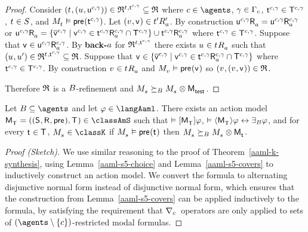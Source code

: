 \begin{proof}
Consider $(\kStateT, (\kStateU, \aStateU[\agentC, \gamma])) \in \refinement^{\kStateT, \aStateT[\agentC, \gamma]} \subseteq \refinement$ where $\agentC \in \agents$, $\gamma \in \Gamma_\agentC$, $\aStateT[\agentC, \gamma] \in \aStatesT[\agentC, \gamma]$, $\kStateT \in \kStates$, and $\kPModel{\kStateT} \entails \aPrecondition(\aStateT[\agentC, \gamma])$.
Let $(\kStateV, \aStateV) \in \kSuccessorsPA{\kStateTP}$.
By construction
$\aSuccessorsA{\aStateU[\agentC, \gamma]} = \aSuccessorsA[\agentC, \gamma]{\aStateU[\agentC, \gamma]}$ or 
$\aSuccessorsA{\aStateU[\agentC, \gamma]} = \{\aPStateV[\agentC, \gamma] \mid \aStateV[\agentC, \gamma] \in \aSuccessorsA[\agentC, \gamma]{\aStateT[\agentC, \gamma]} \cap \aStatesT[\agentC, \gamma]\} \cup \aSuccessorsA[\agentC, \gamma]{\aStateT[\agentC, \gamma]}$ where $\aStateT[\agentC, \gamma] \in \aStatesT[\agentC, \gamma]$.
Suppose that $\aStateV \in \aSuccessorsA[\agentC, \gamma]{\aStateU[\agentC, \gamma]}$.
By {\bf back-$\agentA$} for $\refinement^{\kStateT, \aStateT[\agentC, \gamma]}$ there exists $\kStateU \in \kSuccessorsA{\kStateT}$ such that $(\kStateU, \kStateUP) \in \refinement^{\kStateT, \aStateT[\agentC, \gamma]} \subseteq \refinement$.
Suppose that $\aStateV \in \{\aPStateV[\agentC, \gamma] \mid \aStateV[\agentC, \gamma] \in \aSuccessorsA[\agentC, \gamma]{\aStateT[\agentC, \gamma]} \cap \aStatesT[\agentC, \gamma]\}$ where $\aStateT[\agentC, \gamma] \in \aStatesT[\agentC, \gamma]$.
By construction $\kStateV \in \kSuccessorsA{\kStateT}$ and $\kPModel{\kStateV} \entails \aPrecondition(\aStateV)$ so $(\kStateV, (\kStateV, \aStateV)) \in \refinement$.

Therefore $\refinement$ is a $\agentsB$-refinement and $\kPModel{\kStateS} \simulatesBs \kPModel{\kStateS} \exec \aPModel{\aStateTest}$.

\end{proof}

\begin{theorem}\label{aaml-s-synthesis}
Let $\agentsB \subseteq \agents$ and let $\phi \in \langAaml$.
There exists an action model $\aPModelAndTuple{\aStatesT} \in \classAmS$ such that 
$\entails \actionA{\aPModel{\aStatesT}} \phi$,
$\entails \actionE{\aPModel{\aStatesT}} \phi \iff \someactsBs \phi$, and
for every $\aStateT \in \aStatesT$, $\kPModel{\kStateS} \in \classK$ if $\kPModel{\kStateS} \entails \aPrecondition(\aStateT)$ then $\kPModel{\kStateS} \simulatesBs \kPModel{\kStateS} \exec \aPModel{\aStateT}$.
\end{theorem}

\begin{proof}[Proof (Sketch)]
We use similar reasoning to the proof of Theorem~\ref{aaml-k-synthesis}, using Lemma~\ref{aaml-s5-choice} and Lemma~\ref{aaml-s5-covers} to inductively construct an action model.
We convert the formula to alternating disjunctive normal form instead of disjunctive normal form, which ensures that the construction from Lemma~\ref{aaml-s5-covers} can be applied inductively to the formula, by satisfying the requirement that $\coversC$~operators are only applied to sets of $(\agents \setminus \{\agentC\})$-restricted modal formulas.
\end{proof}

